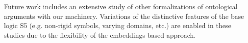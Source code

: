 \documentclass{llncs}
\begin{document}
Future work includes an extensive study of other formalizations of
ontological arguments with our machinery. Variations of the
distinctive features of the base logic S5 (e.g. non-rigid symbols, 
varying domains, etc.) are enabled in these studies due
to the flexibility of the embeddings based approach.



\end{document}
